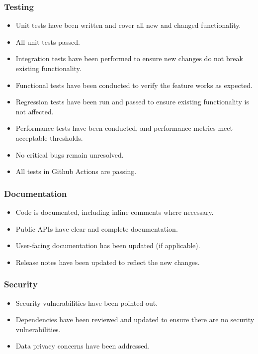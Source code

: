 \subsubsection{Testing}
\begin{itemize}
    \item Unit tests have been written and cover all new and changed functionality.
    \item All unit tests passed.
    \item Integration tests have been performed to ensure new changes do not break existing functionality.
    \item Functional tests have been conducted to verify the feature works as expected.
    \item Regression tests have been run and passed to ensure existing functionality is not affected.
    \item Performance tests have been conducted, and performance metrics meet acceptable thresholds.
    \item No critical bugs remain unresolved.
	\item All tests in Github Actions are passing.
\end{itemize}

\subsubsection{Documentation}
\begin{itemize}
    \item Code is documented, including inline comments where necessary.
    \item Public APIs have clear and complete documentation.
    \item User-facing documentation has been updated (if applicable).
    \item Release notes have been updated to reflect the new changes.
\end{itemize}

\subsubsection{Security}
\begin{itemize}
    \item Security vulnerabilities have been pointed out.
    \item Dependencies have been reviewed and updated to ensure there are no security vulnerabilities.
    \item Data privacy concerns have been addressed.
\end{itemize}

